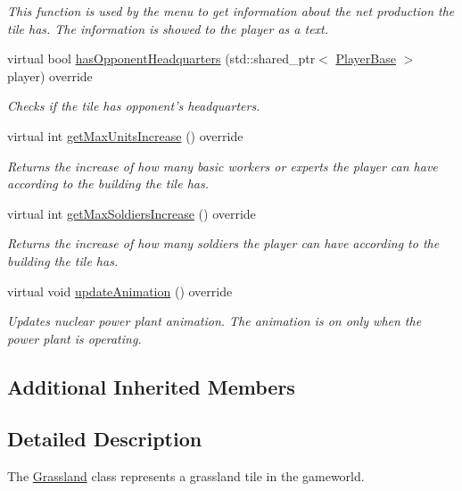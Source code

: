 \begin{DoxyCompactItemize}
\begin{DoxyCompactList}\small\item\em This function is used by the menu to get information about the net production the tile has. The information is showed to the player as a text. \end{DoxyCompactList}\item 
virtual bool \hyperlink{class_course_1_1_grassland_ac5a3cea38462f4ab82fe3c2ddf0bca19}{has\-Opponent\-Headquarters} (std\-::shared\-\_\-ptr$<$ \hyperlink{class_course_1_1_player_base}{Player\-Base} $>$ player) override
\begin{DoxyCompactList}\small\item\em Checks if the tile has opponent's headquarters. \end{DoxyCompactList}\item 
virtual int \hyperlink{class_course_1_1_grassland_a1bb5fd5c45a70751c8a175138060fb94}{get\-Max\-Units\-Increase} () override
\begin{DoxyCompactList}\small\item\em Returns the increase of how many basic workers or experts the player can have according to the building the tile has. \end{DoxyCompactList}\item 
virtual int \hyperlink{class_course_1_1_grassland_ae6266dd4107af80a221e05093b560f62}{get\-Max\-Soldiers\-Increase} () override
\begin{DoxyCompactList}\small\item\em Returns the increase of how many soldiers the player can have according to the building the tile has. \end{DoxyCompactList}\item 
virtual void \hyperlink{class_course_1_1_grassland_a63e385f4a15a53111970f426a54117d5}{update\-Animation} () override
\begin{DoxyCompactList}\small\item\em Updates nuclear power plant animation. The animation is on only when the power plant is operating. \end{DoxyCompactList}\end{DoxyCompactItemize}
\subsection*{Additional Inherited Members}


\subsection{Detailed Description}
The \hyperlink{class_course_1_1_grassland}{Grassland} class represents a grassland tile in the gameworld. 

